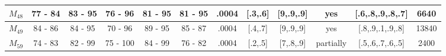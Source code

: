 \begin{table}[H]
{\begin{tabular}{|c|c|c|c|c|c|c|c|c|c|c|c|}
\rowcolor[HTML]{FFFFFF} 
$M_{48}$                                                                             & 77 - 84                                 & 83 - 95                                 & 76 - 96                                 & 81 - 95                                 & 81 - 95                                 & .0004                                                                                   & {[}.3,.6{]}                                                                                 & {[}9,.9,.9{]}                                                                               & yes                                                                                       & {[}.6,.8,.9,.8,.7{]}                                                                    & 6640                                                                                      \\ \hline
\rowcolor[HTML]{FFFFFF} 
$M_{49}$                                                                             & 84 - 86                                 & 84 - 95                                 & 70 - 96                                 & 89 - 95                                 & 85 - 87                                 & .0004                                                                                   & {[}.4,.7{]}                                                                                 & {[}9,.9,.9{]}                                                                               & yes                                                                                       & {[}.8,.9,.1,.9,.8{]}                                                                    & 13840                                                                                     \\ \hline
\rowcolor[HTML]{FFFFFF} 
$M_{59}$                                                                             & 74 - 83                                 & 82 - 99                                 & 75 - 100                                & 84 - 99                                 & 76 - 82                                 & .0004                                                                                   & {[}.2,.5{]}                                                                                 & {[}7,.8,.9{]}                                                                               & partially                                                                                 & {[}.5,.6,.7,.6,.5{]}                                                                    & 2400                                                                                      \\ \hline

\end{tabular}}
\end{table}
